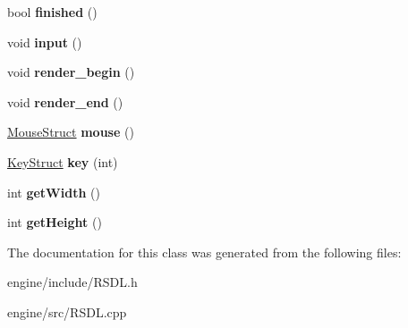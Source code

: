 \begin{DoxyCompactItemize}
\item 
\hypertarget{classRSDL_a4de7a39e0f460f4cd4906069cc0ada6a}{
bool {\bfseries finished} ()}
\label{classRSDL_a4de7a39e0f460f4cd4906069cc0ada6a}

\item 
\hypertarget{classRSDL_aeb7a11c46d1895d201770fa2b9625412}{
void {\bfseries input} ()}
\label{classRSDL_aeb7a11c46d1895d201770fa2b9625412}

\item 
\hypertarget{classRSDL_a0c253f055c7bd372df0ea6654cc0cb48}{
void {\bfseries render\_\-begin} ()}
\label{classRSDL_a0c253f055c7bd372df0ea6654cc0cb48}

\item 
\hypertarget{classRSDL_acda1a87cb1f0735565a38c1037d0eb90}{
void {\bfseries render\_\-end} ()}
\label{classRSDL_acda1a87cb1f0735565a38c1037d0eb90}

\item 
\hypertarget{classRSDL_a33ebb844ae21af49b4e704bb4f6e2602}{
\hyperlink{structMouseStruct}{MouseStruct} {\bfseries mouse} ()}
\label{classRSDL_a33ebb844ae21af49b4e704bb4f6e2602}

\item 
\hypertarget{classRSDL_a4c8d44cd6e6bf7c6a36d963f6a0c8ccf}{
\hyperlink{structKeyStruct}{KeyStruct} {\bfseries key} (int)}
\label{classRSDL_a4c8d44cd6e6bf7c6a36d963f6a0c8ccf}

\item 
\hypertarget{classRSDL_abd0fc4cb4d19b97b3fbc8b1fa104c3d5}{
int {\bfseries getWidth} ()}
\label{classRSDL_abd0fc4cb4d19b97b3fbc8b1fa104c3d5}

\item 
\hypertarget{classRSDL_ae961056a7ce7b421441f2c950df0e99e}{
int {\bfseries getHeight} ()}
\label{classRSDL_ae961056a7ce7b421441f2c950df0e99e}

\end{DoxyCompactItemize}


The documentation for this class was generated from the following files:\begin{DoxyCompactItemize}
\item 
engine/include/RSDL.h\item 
engine/src/RSDL.cpp\end{DoxyCompactItemize}
